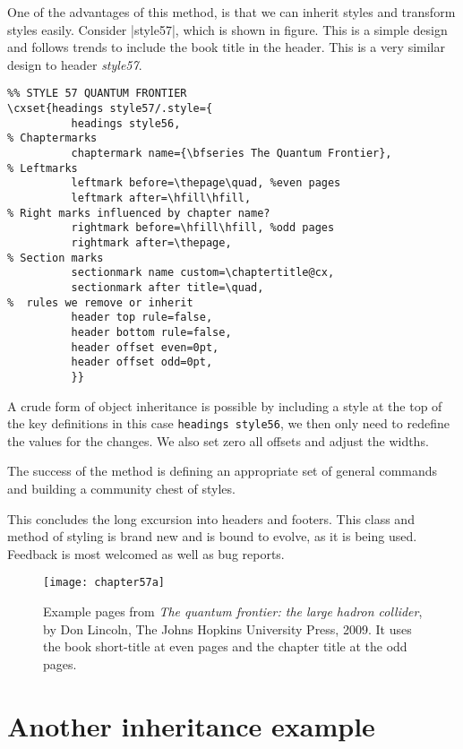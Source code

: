 One of the advantages of this method, is that we can inherit styles and transform styles easily. Consider |style57|, which is shown in figure. This is a simple design and follows trends to include the book title in the header. This is a very similar design to header \textit{style57}.

\begin{tcolorbox}
\begin{lstlisting}
%% STYLE 57 QUANTUM FRONTIER
\cxset{headings style57/.style={
          headings style56,
% Chaptermarks
          chaptermark name={\bfseries The Quantum Frontier},
% Leftmarks
          leftmark before=\thepage\quad, %even pages
          leftmark after=\hfill\hfill,
% Right marks influenced by chapter name?
          rightmark before=\hfill\hfill, %odd pages
          rightmark after=\thepage,
% Section marks
          sectionmark name custom=\chaptertitle@cx,
          sectionmark after title=\quad,
%  rules we remove or inherit
          header top rule=false,
          header bottom rule=false,
          header offset even=0pt,
          header offset odd=0pt,
          }}
\end{lstlisting}
\end{tcolorbox}

A crude form of object inheritance is possible by including a style at the top of the key definitions in this case \texttt{headings style56}, we then only need to redefine the values for the changes. We also set zero all offsets and adjust the widths.

The success of the method is defining an appropriate set of general commands and building a community chest of styles.

This concludes the long excursion into headers and footers. This class and method of styling is brand new and is bound to evolve, as it is being used. Feedback is most welcomed as well as bug reports.
\begin{figure}[tp]
\centering
\texttt{[image: chapter57a]}\vspace{0.5\baselineskip}
\caption{Example pages from \textit{The quantum frontier: the large hadron collider}, by Don Lincoln, The Johns Hopkins University Press, 2009.  It uses the book short-title at even pages and the chapter title at the odd pages.}
\end{figure}

\section{Another inheritance example}

